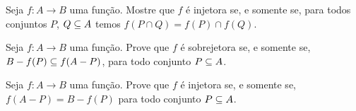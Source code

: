 \documentclass[12pt]{exam}
\begin{document}
\vspace{.3cm}

\questao{} Seja $f : A \to B$ uma função. Mostre que $f$ é injetora se, e somente se, para todos conjuntos $P$, $Q \subseteq A$ temos $f(P \cap Q) = f(P) \cap f(Q)$.

\vspace{.3cm}

\questao{} Seja $f : A \to B$ uma função. Prove que $f$ é sobrejetora se, e somente se, $B - f(P) \subseteq f(A - P)$, para todo conjunto $P \subseteq A$.

\vspace{.3cm}

\questao{} Seja $f: A \to B$ uma função. Prove que $f$ é injetora se, e somente se, $f(A - P) = B - f(P)$ para todo conjunto $P \subseteq A$.
\end{document}
